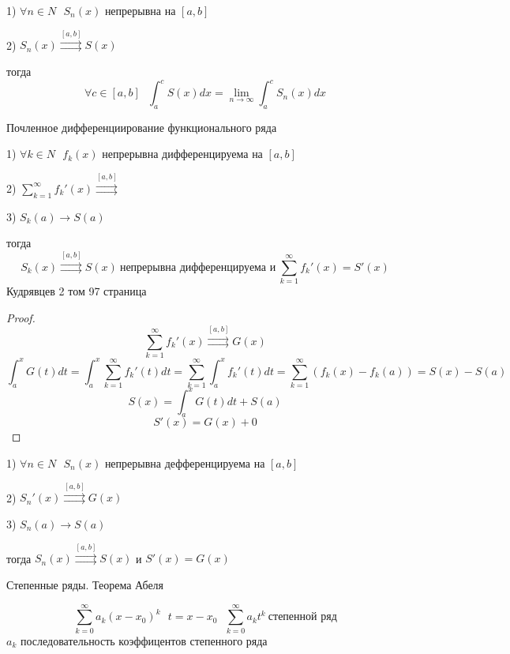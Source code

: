 \begin{theorem}
  1) $\forall n \in N ~~~ S_n(x)$ непрерывна на $[a,b]$

  2) $S_n(x) \stackrel{[a, b]}{\rightrightarrows} S(x)$

  тогда
  $$
  \forall c \in [a,b] ~~~ \int_a^c S(x)dx = \lim_{n \to \infty}
  \int_a^c S_n(x)dx
  $$
\end{theorem}

\begin{title}[\Large]
  Почленное дифференциирование функционального ряда
\end{title}

\begin{theorem}
  1) $\forall k \in N ~~~ f_k(x)$ непрерывна дифференцируема на $[a,b]$

  2) $\sum_{k=1}^{\infty} f_k'(x) \stackrel{[a, b]}{\rightrightarrows}$

  3) $S_k(a) \rightarrow S(a)$

  тогда
  $$
  S_k(x) \stackrel{[a, b]}{\rightrightarrows} S(x) ~
  \text{непрерывна дифференцируема и} ~ \sum_{k=1}^{\infty} f_k'(x) = S'(x)
  $$
  Кудрявцев 2 том 97 страница
\end{theorem}

\begin{proof}
  $$
  \sum_{k=1}^{\infty} f_k'(x) \stackrel{[a,b]}{\rightrightarrows} G(x)
  $$
  $$
  \int_a^x G(t)dt = \int_a^x \sum_{k=1}^{\infty} f_k'(t) dt =
  \sum_{k=1}^{\infty} \int_a^x f_k'(t) dt = \sum_{k=1}^{\infty}
  (f_k(x) - f_k(a)) = S(x) - S(a)
  $$
  $$
  S(x) = \int_a^x G(t)dt + S(a)
  $$
  $$
  S'(x) = G(x) + 0
  $$
\end{proof}

\begin{theorem}
  1) $\forall n \in N ~~~ S_n(x)$ непрерывна дефференцируема на $[a,b]$

  2) $S_n'(x) \stackrel{[a,b]}{\rightrightarrows} G(x)$

  3) $S_n(a) \to S(a)$

  тогда $S_n(x) \stackrel{[a,b]}{\rightrightarrows} S(x)$ и $S'(x) = G(x)$
\end{theorem}

\begin{title}[\Large]
  Степенные ряды. Теорема Абеля
\end{title}

\begin{define}
  $$
  \sum_{k=0}^{\infty} a_k (x-x_0)^k ~~~ t = x - x_0 ~~~
  \sum_{k=0}^{\infty} a_k t^k ~ \text{степенной ряд}
  $$
  $a_k$ последовательность коэффицентов степенного ряда
\end{define}


